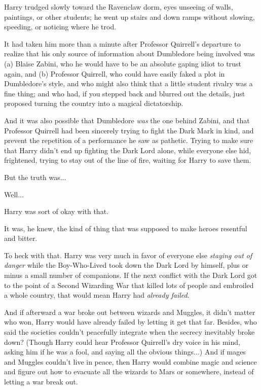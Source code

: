 Harry trudged slowly toward the Ravenclaw dorm, eyes unseeing of walls, paintings, or other students; he went up stairs and down ramps without slowing, speeding, or noticing where he trod.

It had taken him more than a minute after Professor Quirrell's departure to realize that his only source of information about Dumbledore being involved was (a) Blaise Zabini, who he would have to be an absolute gaping idiot to trust again, and (b) Professor Quirrell, who could have easily faked a plot in Dumbledore's style, and who might also think that a little student rivalry was a fine thing; and who had, if you stepped back and blurred out the details, just proposed turning the country into a magical dictatorship.

And it was also possible that Dumbledore \emph{was} the one behind Zabini, and that Professor Quirrell had been sincerely trying to fight the Dark Mark in kind, and prevent the repetition of a performance he saw as pathetic. Trying to make sure that Harry didn't end up fighting the Dark Lord alone, while everyone else hid, frightened, trying to stay out of the line of fire, waiting for Harry to save them.

But the truth was...

Well...

Harry was sort of okay with that.

It was, he knew, the kind of thing that was supposed to make heroes resentful and bitter.

To heck with that. Harry was very much in favor of everyone else \emph{staying out of danger} while the Boy-Who-Lived took down the Dark Lord by himself, plus or minus a small number of companions. If the next conflict with the Dark Lord got to the point of a Second Wizarding War that killed lots of people and embroiled a whole country, that would mean Harry had \emph{already failed}.

And if afterward a war broke out between wizards and Muggles, it didn't matter who won, Harry would have already failed by letting it get that far. Besides, who said the societies couldn't peacefully integrate when the secrecy inevitably broke down? (Though Harry could hear Professor Quirrell's dry voice in his mind, asking him if he was a fool, and saying all the obvious things...) And if mages and Muggles couldn't live in peace, then Harry would combine magic and science and figure out how to evacuate all the wizards to Mars or somewhere, instead of letting a war break out.

